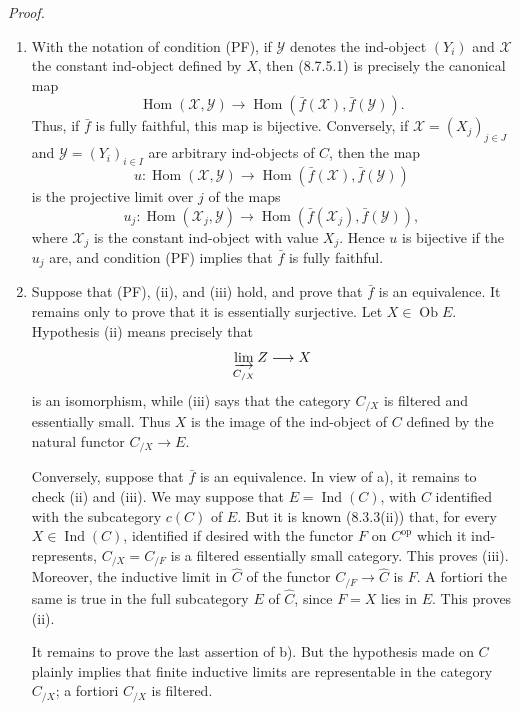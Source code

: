 \documentclass[11pt]{article}
\newcommand{\Ob}{\operatorname{Ob}}
\newcommand{\Hom}{\operatorname{Hom}}
\newcommand{\Ind}{\operatorname{Ind}}
\newcommand{\op}{\mathrm{op}}
\newenvironment{proofsketch}{\par\noindent\emph{Proof.}\ }{\par\medskip}
\begin{document}
\begin{proofsketch}
\begin{enumerate}[label=\alph*)]
\item With the notation of condition \textup{(PF)}, if $\mathcal Y$ denotes the ind-object $(Y_i)$ and $\mathcal X$ the constant ind-object defined by $X$, then (8.7.5.1) is precisely the canonical map
\[
 \Hom(\mathcal X,\mathcal Y)\longrightarrow
 \Hom(\bar f(\mathcal X),\bar f(\mathcal Y)).
\]
Thus, if $\bar f$ is fully faithful, this map is bijective. Conversely, if $\mathcal X=(X_j)_{j\in J}$ and $\mathcal Y=(Y_i)_{i\in I}$ are arbitrary ind-objects of $C$, then the map
\[
 u:\Hom(\mathcal X,\mathcal Y)\longrightarrow
 \Hom(\bar f(\mathcal X),\bar f(\mathcal Y))
\]
is the projective limit over $j$ of the maps
\[
 u_j:\Hom(\mathcal X_j,\mathcal Y)\longrightarrow
 \Hom(\bar f(\mathcal X_j),\bar f(\mathcal Y)),
\]
where $\mathcal X_j$ is the constant ind-object with value $X_j$. Hence $u$ is bijective if the $u_j$ are, and condition \textup{(PF)} implies that $\bar f$ is fully faithful.

\item Suppose that \textup{(PF)}, (ii), and (iii) hold, and prove that $\bar f$ is an equivalence. It remains only to prove that it is essentially surjective. Let $X\in\Ob E$. Hypothesis (ii) means precisely that
\[
 \varinjlim_{C_{/X}} Z\longrightarrow X
\]
is an isomorphism, while (iii) says that the category $C_{/X}$ is filtered and essentially small. Thus $X$ is the image of the ind-object of $C$ defined by the natural functor $C_{/X}\to E$.

Conversely, suppose that $\bar f$ is an equivalence. In view of a), it remains to check (ii) and (iii). We may suppose that $E=\Ind(C)$, with $C$ identified with the subcategory $c(C)$ of $E$. But it is known (8.3.3(ii)) that, for every $X\in\Ind(C)$, identified if desired with the functor $F$ on $C^\op$ which it ind-represents, $C_{/X}=C_{/F}$ is a filtered essentially small category. This proves (iii). Moreover, the inductive limit in $\widehat C$ of the functor $C_{/F}\to\widehat C$ is $F$. A fortiori the same is true in the full subcategory $E$ of $\widehat C$, since $F=X$ lies in $E$. This proves (ii).

It remains to prove the last assertion of b). But the hypothesis made on $C$ plainly implies that finite inductive limits are representable in the category $C_{/X}$; a fortiori $C_{/X}$ is filtered.
\end{enumerate}
\end{proofsketch}
\end{document}
